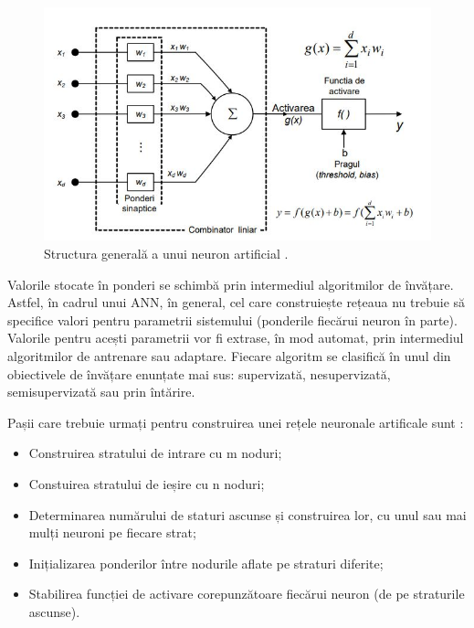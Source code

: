 \documentclass[a4paper,12pt]{report}
\begin{document}
\begin{figure}[h!]
    \centering
    \includegraphics[width=13cm]{..//resources//images//structura_generala_a_unui_neuron.JPG} 
    \caption{Structura generală a unui neuron artificial \cite{Tehnici-de-inteligență-computațională-Aplicații-în-electronică-și-biomedicină}.}
\end{figure}

Valorile stocate în ponderi se schimbă prin intermediul 
algoritmilor de învățare. Astfel, în cadrul unui ANN, în general, cel care
construiește rețeaua nu trebuie să specifice valori pentru parametrii sistemului
(ponderile fiecărui neuron în parte). Valorile pentru acești parametrii vor fi extrase,
în mod automat, prin intermediul algoritmilor de antrenare sau adaptare. Fiecare algoritm se
clasifică în unul din obiectivele de învățare enunțate mai sus: supervizată, nesupervizată,
semisupervizată sau prin întărire.

Pașii care trebuie urmați pentru construirea 
unei rețele neuronale artificale sunt \cite{Hands-On-Machine-Learning}:
\begin{itemize}
    \item Construirea stratului de intrare cu m noduri;
    \item Constuirea stratului de ieșire cu n noduri;
    \item Determinarea numărului de staturi ascunse și construirea lor, cu unul sau mai mulți neuroni
    pe fiecare strat;
    \item Inițializarea ponderilor între nodurile aflate pe straturi diferite;
    \item Stabilirea funcției de activare corepunzătoare fiecărui neuron (de pe straturile ascunse).
\end{itemize}
\end{document}
